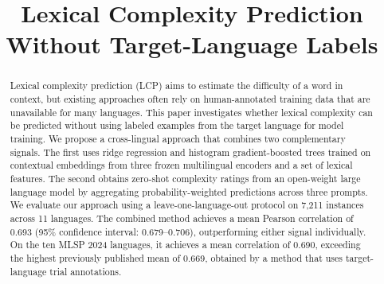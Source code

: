 \documentclass[11pt]{article}
\title{Lexical Complexity Prediction Without Target-Language Labels}
\author{}
\begin{document}
\maketitle


\begin{abstract}
Lexical complexity prediction (LCP) aims to estimate the difficulty of a word in context, but existing approaches often rely on human-annotated training data that are unavailable for many languages. This paper investigates whether lexical complexity can be predicted without using labeled examples from the target language for model training. We propose a cross-lingual approach that combines two complementary signals. The first uses ridge regression and histogram gradient-boosted trees trained on contextual embeddings from three frozen multilingual encoders and a set of lexical features. The second obtains zero-shot complexity ratings from an open-weight large language model by aggregating probability-weighted predictions across three prompts. We evaluate our approach using a leave-one-language-out protocol on 7,211 instances across 11 languages. The combined method achieves a mean Pearson correlation of 0.693 (95\% confidence interval: 0.679–0.706), outperforming either signal individually. On the ten MLSP 2024 languages, it achieves a mean correlation of 0.690, exceeding the highest previously published mean of 0.669, obtained by a method that uses target-language trial annotations. 
\end{abstract}

\end{document}
